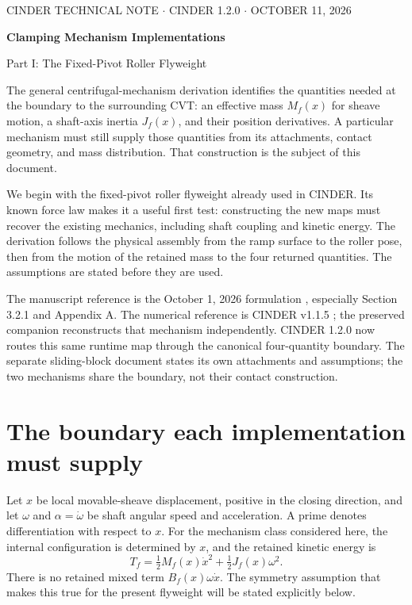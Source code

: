 \documentclass[11pt,letterpaper]{article}
\numberwithin{equation}{section}
\newcommand{\half}{\tfrac12}
\begin{document}
\thispagestyle{plain}
\begin{center}
{\small CINDER TECHNICAL NOTE \quad $\cdot$ \quad CINDER 1.2.0 \quad $\cdot$ \quad OCTOBER 11, 2026}
\vspace{.7em}

{\LARGE\bfseries Clamping Mechanism Implementations\par}
\vspace{.45em}
{\large Part I: The Fixed-Pivot Roller Flyweight\par}
\end{center}
\vspace{.4em}

The general centrifugal-mechanism derivation \cite{general} identifies the quantities needed at the boundary to the surrounding CVT: an effective mass $M_f(x)$ for sheave motion, a shaft-axis inertia $J_f(x)$, and their position derivatives. A particular mechanism must still supply those quantities from its attachments, contact geometry, and mass distribution. That construction is the subject of this document.

We begin with the fixed-pivot roller flyweight already used in CINDER. Its known force law makes it a useful first test: constructing the new maps must recover the existing mechanics, including shaft coupling and kinetic energy. The derivation follows the physical assembly from the ramp surface to the roller pose, then from the motion of the retained mass to the four returned quantities. The assumptions are stated before they are used.

The manuscript reference is the October 1, 2026 formulation \cite{formulation}, especially Section 3.2.1 and Appendix A. The numerical reference is CINDER v1.1.5 \cite{implementation}; the preserved companion reconstructs that mechanism independently. CINDER 1.2.0 now routes this same runtime map through the canonical four-quantity boundary. The separate sliding-block document states its own attachments and assumptions; the two mechanisms share the boundary, not their contact construction.

\hypertarget{note-contents}{}
\begingroup\small\setlength{\parskip}{0pt}
\setcounter{tocdepth}{1}\tableofcontents
\endgroup\clearpage
\section{The boundary each implementation must supply}
\label{sec:boundary}

Let $x$ be local movable-sheave displacement, positive in the closing direction, and let $\omega$ and $\alpha=\dot\omega$ be shaft angular speed and acceleration. A prime denotes differentiation with respect to $x$. For the mechanism class considered here, the internal configuration is determined by $x$, and the retained kinetic energy is
\begin{equation}
  T_f=\half M_f(x)\dot x^2+\half J_f(x)\omega^2.
  \label{eq:energy}
\end{equation}
There is no retained mixed term $B_f(x)\omega\dot x$. The symmetry assumption that makes this true for the present flyweight will be stated explicitly below.
\end{document}
